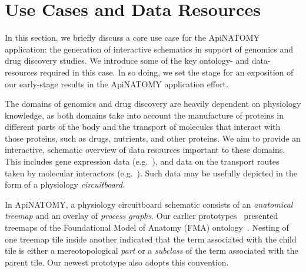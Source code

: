\section{Use Cases and Data Resources} \label{sect:motivation}                           %

In this section, we briefly discuss a core use case for the ApiNATOMY application: the generation of interactive schematics in support of genomics and drug discovery studies. We introduce some of the key ontology- and data-resources required in this case. In so doing, we set the stage for an exposition of our early-stage results in the ApiNATOMY application effort.

The domains of genomics and drug discovery are heavily dependent on physiology knowledge, as both domains take into account the manufacture of proteins in different parts of the body and the transport of molecules that interact with those proteins, such as drugs, nutrients, and other proteins.
We aim to provide an interactive, schematic overview of data resources important to these domains. This includes gene expression data (e.g.~\cite{EBI}), and data on the transport routes taken by molecular interactors (e.g.~\cite{HMC+13}). Such data may be usefully depicted in the form of a physiology \emph{circuitboard}.

In ApiNATOMY, a physiology circuitboard schematic consists of an \emph{anatomical treemap} and an overlay of \emph{process graphs}. Our earlier prototypes~\cite{BGS12,KBK14} presented treemaps of the Foundational Model of Anatomy (FMA) ontology~\cite{RM03}. Nesting of one treemap tile inside another indicated that the term associated with the child tile is either a mereotopological \emph{part} or a \emph{subclass} of the term associated with the parent tile. Our newest prototype also adopts this convention.

